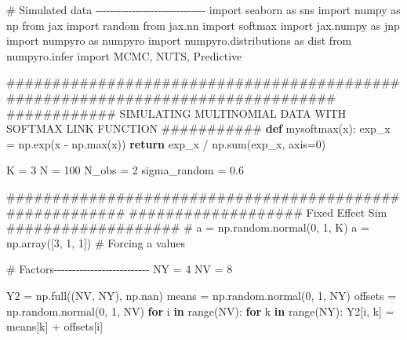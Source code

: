 \documentclass[
  letterpaper,
  DIV=11,
  numbers=noendperiod]{scrreprt}
\newenvironment{Shaded}{\begin{snugshade}}{\end{snugshade}}
\newcommand{\BuiltInTok}[1]{\textcolor[rgb]{0.00,0.23,0.31}{#1}}
\newcommand{\CommentTok}[1]{\textcolor[rgb]{0.37,0.37,0.37}{#1}}
\newcommand{\ControlFlowTok}[1]{\textcolor[rgb]{0.00,0.23,0.31}{\textbf{#1}}}
\newcommand{\DecValTok}[1]{\textcolor[rgb]{0.68,0.00,0.00}{#1}}
\newcommand{\FloatTok}[1]{\textcolor[rgb]{0.68,0.00,0.00}{#1}}
\newcommand{\ImportTok}[1]{\textcolor[rgb]{0.00,0.46,0.62}{#1}}
\newcommand{\KeywordTok}[1]{\textcolor[rgb]{0.00,0.23,0.31}{\textbf{#1}}}
\newcommand{\NormalTok}[1]{\textcolor[rgb]{0.00,0.23,0.31}{#1}}
\newcommand{\OperatorTok}[1]{\textcolor[rgb]{0.37,0.37,0.37}{#1}}
\begin{document}
\begin{Shaded}
\begin{Highlighting}[]
\CommentTok{\# Simulated data {-}{-}{-}{-}{-}{-}{-}{-}{-}{-}{-}{-}{-}{-}{-}{-}{-}{-}{-}{-}{-}{-}{-}{-}{-}{-}{-}{-}{-}{-}}
\ImportTok{import}\NormalTok{ seaborn }\ImportTok{as}\NormalTok{ sns}
\ImportTok{import}\NormalTok{ numpy }\ImportTok{as}\NormalTok{ np}
\ImportTok{from}\NormalTok{ jax }\ImportTok{import}\NormalTok{ random}
\ImportTok{from}\NormalTok{ jax.nn }\ImportTok{import}\NormalTok{ softmax}
\ImportTok{import}\NormalTok{ jax.numpy }\ImportTok{as}\NormalTok{ jnp}
\ImportTok{import}\NormalTok{ numpyro }\ImportTok{as}\NormalTok{ numpyro}
\ImportTok{import}\NormalTok{ numpyro.distributions }\ImportTok{as}\NormalTok{ dist}
\ImportTok{from}\NormalTok{ numpyro.infer }\ImportTok{import}\NormalTok{ MCMC, NUTS, Predictive}

\CommentTok{\#\#\#\#\#\#\#\#\#\#\#\#\#\#\#\#\#\#\#\#\#\#\#\#\#\#\#\#\#\#\#\#\#\#\#\#\#\#\#\#\#\#\#\#\#\#\#\#\#\#\#\#\#\#\#\#\#\#\#\#\#\#\#\#\#\#\#\#\#\#\#\#\#\#\#\#\#\#\#}
\CommentTok{\#\#\#\#\#\#\#\#\#\#\#\# SIMULATING MULTINOMIAL DATA WITH SOFTMAX LINK FUNCTION \#\#\#\#\#\#\#\#\#\#\#}
\KeywordTok{def}\NormalTok{ mysoftmax(x):}
\NormalTok{    exp\_x }\OperatorTok{=}\NormalTok{ np.exp(x }\OperatorTok{{-}}\NormalTok{ np.}\BuiltInTok{max}\NormalTok{(x))}
    \ControlFlowTok{return}\NormalTok{ exp\_x }\OperatorTok{/}\NormalTok{ np.}\BuiltInTok{sum}\NormalTok{(exp\_x, axis}\OperatorTok{=}\DecValTok{0}\NormalTok{)}

\NormalTok{K }\OperatorTok{=} \DecValTok{3}
\NormalTok{N }\OperatorTok{=} \DecValTok{100}
\NormalTok{N\_obs }\OperatorTok{=} \DecValTok{2}
\NormalTok{sigma\_random }\OperatorTok{=} \FloatTok{0.6}

\CommentTok{\#\#\#\#\#\#\#\#\#\#\#\#\#\#\#\#\#\#\#\#\#\#\#\#\#\#\#\#\#\#\#\#\#\#\#\#\#\#\#\#\#\#\#\#\#\#\#\#\#\#\#\#\#\#\#\#}
\CommentTok{\#\#\#\#\#\#\#\#\#\#\#\#\#\#\#\#\#\#\# Fixed Effect Sim \#\#\#\#\#\#\#\#\#\#\#\#\#\#\#\#\#\#\#}
\CommentTok{\# a = np.random.normal(0, 1, K)}
\NormalTok{a }\OperatorTok{=}\NormalTok{ np.array([}\DecValTok{3}\NormalTok{, }\DecValTok{1}\NormalTok{, }\DecValTok{1}\NormalTok{])  }\CommentTok{\# Forcing a values}

\CommentTok{\# Factors{-}{-}{-}{-}{-}{-}{-}{-}{-}{-}{-}{-}{-}{-}{-}{-}{-}{-}{-}{-}{-}{-}{-}{-}{-}{-}}
\NormalTok{NY }\OperatorTok{=} \DecValTok{4}
\NormalTok{NV }\OperatorTok{=} \DecValTok{8}

\NormalTok{Y2 }\OperatorTok{=}\NormalTok{ np.full((NV, NY), np.nan) }
\NormalTok{means }\OperatorTok{=}\NormalTok{ np.random.normal(}\DecValTok{0}\NormalTok{, }\DecValTok{1}\NormalTok{, NY)}
\NormalTok{offsets }\OperatorTok{=}\NormalTok{ np.random.normal(}\DecValTok{0}\NormalTok{, }\DecValTok{1}\NormalTok{, NV)}
\ControlFlowTok{for}\NormalTok{ i }\KeywordTok{in} \BuiltInTok{range}\NormalTok{(NV):}
    \ControlFlowTok{for}\NormalTok{ k }\KeywordTok{in} \BuiltInTok{range}\NormalTok{(NY):}
\NormalTok{        Y2[i, k] }\OperatorTok{=}\NormalTok{ means[k] }\OperatorTok{+}\NormalTok{ offsets[i]}


\end{Highlighting}
\end{Shaded}
\end{document}
